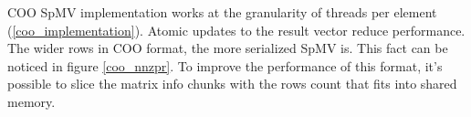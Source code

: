 \documentclass{article}
\begin{document}
\begin{figure}[H]
\centering
{}
\qquad %
\end{figure}

COO SpMV implementation works at the granularity of threads per element (\ref{coo_implementation}). Atomic updates to the result vector 
reduce performance. The wider rows in COO format, the more serialized SpMV is. This fact can be noticed in figure \ref{coo_nnzpr}. To improve
the performance of this format, it's possible to slice the matrix info chunks with the rows count that fits into shared memory.
\end{document}

